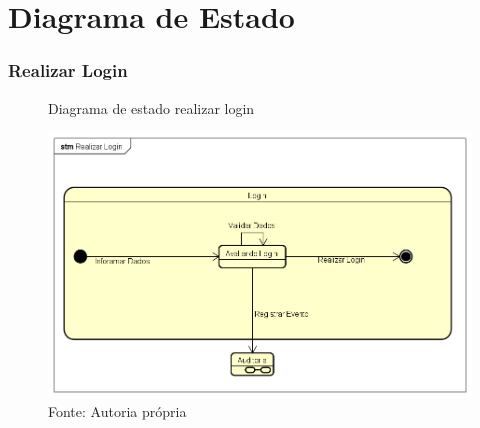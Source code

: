 \documentclass{utfpr-pg}
\begin{document}
\chapter{Diagrama de Estado}
\subsection{Realizar Login}
        \begin{figure}[H]
            \centering
            \captionsetup{width=\textwidth}
            \caption{Diagrama de estado realizar login}
            \includegraphics[width=\linewidth]{fotos/est1.png}
            \caption*{Fonte: Autoria própria}
            \label{fig:Diagrama de Classes}
        \end{figure}

\end{document}

